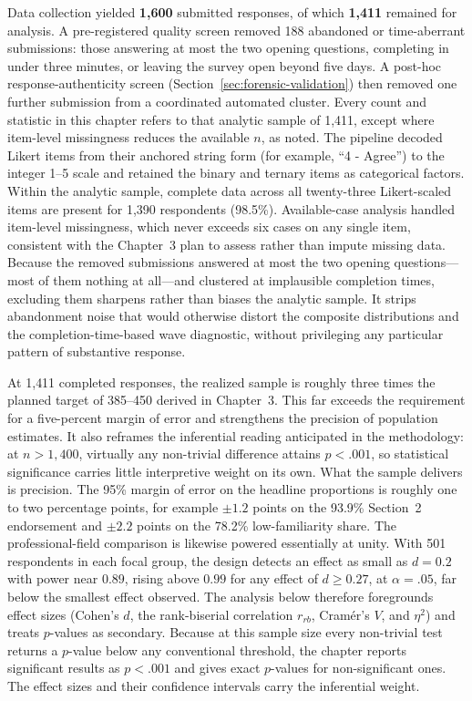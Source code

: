 Data collection yielded \textbf{1{,}600} submitted responses, of which \textbf{1{,}411} remained for analysis. A pre-registered quality screen removed 188 abandoned or time-aberrant submissions: those answering at most the two opening questions, completing in under three minutes, or leaving the survey open beyond five days. A post-hoc response-authenticity screen (Section~\ref{sec:forensic-validation}) then removed one further submission from a coordinated automated cluster. Every count and statistic in this chapter refers to that analytic sample of 1{,}411, except where item-level missingness reduces the available $n$, as noted. The pipeline decoded Likert items from their anchored string form (for example, ``4 - Agree'') to the integer 1--5 scale and retained the binary and ternary items as categorical factors. Within the analytic sample, complete data across all twenty-three Likert-scaled items are present for 1{,}390 respondents (98.5\%). Available-case analysis handled item-level missingness, which never exceeds six cases on any single item, consistent with the Chapter~3 plan to assess rather than impute missing data. Because the removed submissions answered at most the two opening questions---most of them nothing at all---and clustered at implausible completion times, excluding them sharpens rather than biases the analytic sample. It strips abandonment noise that would otherwise distort the composite distributions and the completion-time-based wave diagnostic, without privileging any particular pattern of substantive response.

At 1{,}411 completed responses, the realized sample is roughly three times the planned target of 385--450 derived in Chapter~3. This far exceeds the requirement for a five-percent margin of error and strengthens the precision of population estimates. It also reframes the inferential reading anticipated in the methodology: at $n>1{,}400$, virtually any non-trivial difference attains $p<.001$, so statistical significance carries little interpretive weight on its own. What the sample delivers is precision. The 95\% margin of error on the headline proportions is roughly one to two percentage points, for example $\pm1.2$ points on the 93.9\% Section~2 endorsement and $\pm2.2$ points on the 78.2\% low-familiarity share. The professional-field comparison is likewise powered essentially at unity. With 501 respondents in each focal group, the design detects an effect as small as $d=0.2$ with power near $0.89$, rising above $0.99$ for any effect of $d\geq0.27$, at $\alpha=.05$, far below the smallest effect observed. The analysis below therefore foregrounds effect sizes (Cohen's $d$, the rank-biserial correlation $r_{rb}$, Cram\'er's $V$, and $\eta^2$) and treats $p$-values as secondary. Because at this sample size every non-trivial test returns a $p$-value below any conventional threshold, the chapter reports significant results as $p<.001$ and gives exact $p$-values for non-significant ones. The effect sizes and their confidence intervals carry the inferential weight.

